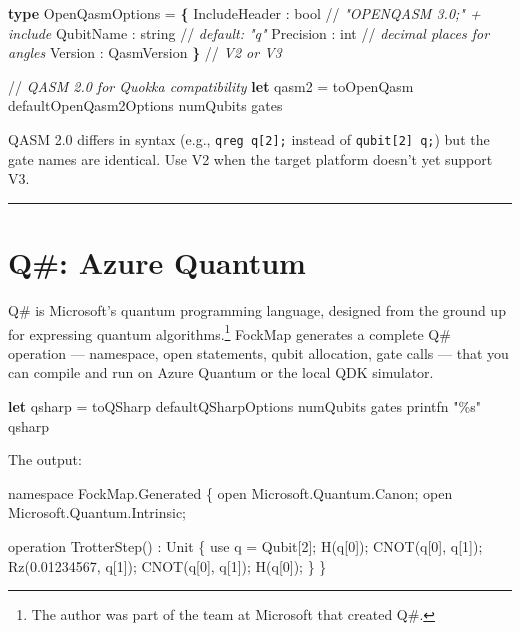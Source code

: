 \documentclass[
  11pt,
  oneside]{book}
\newenvironment{Shaded}{\begin{snugshade}}{\end{snugshade}}
\newcommand{\CommentTok}[1]{\textcolor[rgb]{0.56,0.35,0.01}{\textit{#1}}}
\newcommand{\DataTypeTok}[1]{\textcolor[rgb]{0.13,0.29,0.53}{#1}}
\newcommand{\KeywordTok}[1]{\textcolor[rgb]{0.13,0.29,0.53}{\textbf{#1}}}
\newcommand{\NormalTok}[1]{#1}
\newcommand{\OperatorTok}[1]{\textcolor[rgb]{0.81,0.36,0.00}{\textbf{#1}}}
\newcommand{\StringTok}[1]{\textcolor[rgb]{0.31,0.60,0.02}{#1}}
\begin{document}
\begin{Shaded}
\begin{Highlighting}[]
\KeywordTok{type}\NormalTok{ OpenQasmOptions =}
    \OperatorTok{\{}\NormalTok{ IncludeHeader : }\DataTypeTok{bool}\NormalTok{      //}\CommentTok{ "OPENQASM 3.0;" + include}
\NormalTok{      QubitName     : }\DataTypeTok{string}\NormalTok{    //}\CommentTok{ default: "q"}
\NormalTok{      Precision     : }\DataTypeTok{int}\NormalTok{       //}\CommentTok{ decimal places for angles}
\NormalTok{      Version       : QasmVersion }\OperatorTok{\}}\NormalTok{  //}\CommentTok{ V2 or V3}

\NormalTok{//}\CommentTok{ QASM 2.0 for Quokka compatibility}
\KeywordTok{let}\NormalTok{ qasm2 = toOpenQasm defaultOpenQasm2Options numQubits gates}
\end{Highlighting}
\end{Shaded}

QASM 2.0 differs in syntax (e.g., \texttt{qreg\ q{[}2{]};} instead of
\texttt{qubit{[}2{]}\ q;}) but the gate names are identical. Use V2 when
the target platform doesn't yet support V3.

\begin{center}\rule{0.5\linewidth}{0.5pt}\end{center}

\section{Q\#: Azure Quantum}\label{q-azure-quantum}

Q\# is Microsoft's quantum programming language, designed from the
ground up for expressing quantum algorithms.\footnote{The author was
  part of the team at Microsoft that created Q\#.} FockMap generates a
complete Q\# operation --- namespace, open statements, qubit allocation,
gate calls --- that you can compile and run on Azure Quantum or the
local QDK simulator.

\begin{Shaded}
\begin{Highlighting}[]
\KeywordTok{let}\NormalTok{ qsharp = toQSharp defaultQSharpOptions numQubits gates}
\NormalTok{printfn }\StringTok{"\%s"}\NormalTok{ qsharp}
\end{Highlighting}
\end{Shaded}

The output:

\begin{Shaded}
\begin{Highlighting}[]
\NormalTok{namespace FockMap.Generated \{}
\NormalTok{    open Microsoft.Quantum.Canon;}
\NormalTok{    open Microsoft.Quantum.Intrinsic;}

\NormalTok{    operation TrotterStep() : Unit \{}
\NormalTok{        use q = Qubit[2];}
\NormalTok{        H(q[0]);}
\NormalTok{        CNOT(q[0], q[1]);}
\NormalTok{        Rz(0.01234567, q[1]);}
\NormalTok{        CNOT(q[0], q[1]);}
\NormalTok{        H(q[0]);}
\NormalTok{    \}}
\NormalTok{\}}
\end{Highlighting}
\end{Shaded}
\end{document}
